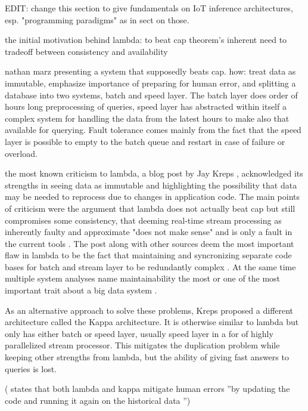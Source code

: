 EDIT: change this section to give fundamentals on IoT inference architectures, esp. "programming paradigms" as in \cite{iotsystems} sect on those.


the initial motivation behind lambda: to beat cap theorem's inherent need to tradeoff between consistency and availability \cite{lambdakappa}

nathan marz presenting a system that supposedly beats cap. how: treat data as immutable, emphasize importance of preparing for human error, and splitting a database into two systems, batch and speed layer. The batch layer does order of hours long preprocessing of queries, speed layer has  abstracted within itself a complex system for handling the data from the latest hours to make also that available for querying. Fault tolerance comes mainly from the fact that the speed layer is possible to empty to the batch queue and restart in case of failure or overload.

the most known criticism to lambda, a blog post by Jay Kreps \cite{questioninglambda}, acknowledged its strengths in seeing data as immutable and highlighting the possibility that data may be needed to reprocess due to changes in application code. The main points of criticism were the argument that lambda does not actually beat cap but still compromises some consistency, that deeming real-time stream processing as inherently faulty and approximate "does not make sense" and is only a fault in the current tools \cite{questioninglambda}. The post along with other sources deem the most important flaw in lambda to be the fact that maintaining and syncronizing separate code bases for batch and stream layer to be redundantly complex \cite{uber} \cite{facebook}. At the same time multiple system analyses name maintainability the most or one of the most important trait about a big data system \cite{facebook} \cite{storm@twitter}.

As an alternative approach to solve these problems, Kreps proposed a different architecture called the Kappa architecture. It is otherwise similar to lambda but only has either batch or speed layer, usually speed layer in a for of highly parallelized stream processor. This mitigates the duplication problem while keeping other strengths from lambda, but the ability of giving fast answers to queries is lost.

(\cite{D1.1} states that both lambda and kappa mitigate human errors ''by  updating  the  code  and  running  it  again  on  the historical  data '')


